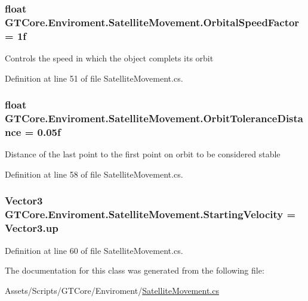 \subsubsection[{Orbital\+Speed\+Factor}]{\setlength{\rightskip}{0pt plus 5cm}float G\+T\+Core.\+Enviroment.\+Satellite\+Movement.\+Orbital\+Speed\+Factor = 1f}\label{class_g_t_core_1_1_enviroment_1_1_satellite_movement_a50b66bcd0969474ef47af91dcd129b72}


Controls the speed in which the object complets its orbit 



Definition at line 51 of file Satellite\+Movement.\+cs.

\hypertarget{class_g_t_core_1_1_enviroment_1_1_satellite_movement_a87d2eb7380cf22cc86c30e8812eabe28}{}
\subsubsection[{Orbit\+Tolerance\+Distance}]{\setlength{\rightskip}{0pt plus 5cm}float G\+T\+Core.\+Enviroment.\+Satellite\+Movement.\+Orbit\+Tolerance\+Distance = 0.\+05f}\label{class_g_t_core_1_1_enviroment_1_1_satellite_movement_a87d2eb7380cf22cc86c30e8812eabe28}


Distance of the last point to the first point on orbit to be considered stable 



Definition at line 58 of file Satellite\+Movement.\+cs.

\hypertarget{class_g_t_core_1_1_enviroment_1_1_satellite_movement_a40de5e52bf15f802fc963ff3ee3434bc}{}
\subsubsection[{Starting\+Velocity}]{\setlength{\rightskip}{0pt plus 5cm}Vector3 G\+T\+Core.\+Enviroment.\+Satellite\+Movement.\+Starting\+Velocity = Vector3.\+up}\label{class_g_t_core_1_1_enviroment_1_1_satellite_movement_a40de5e52bf15f802fc963ff3ee3434bc}


Definition at line 60 of file Satellite\+Movement.\+cs.



The documentation for this class was generated from the following file\+:\begin{DoxyCompactItemize}
\item 
Assets/\+Scripts/\+G\+T\+Core/\+Enviroment/\hyperlink{_satellite_movement_8cs}{Satellite\+Movement.\+cs}\end{DoxyCompactItemize}
